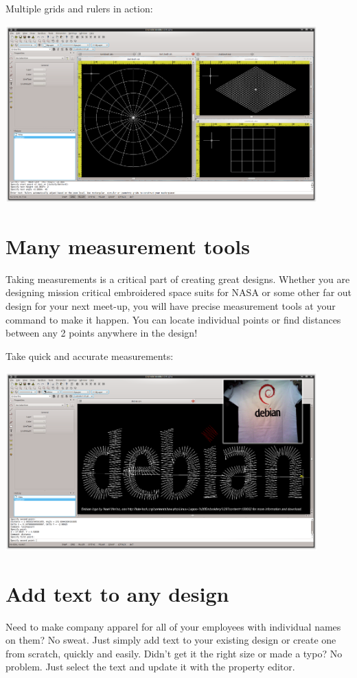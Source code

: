 \documentclass{report}
\begin{document}
Multiple grids and rulers in action:

\includegraphics[width=0.9\textwidth]{images/features-grid-ruler-1.png}

\section{Many measurement tools}

Taking measurements is a critical part of creating great designs. Whether you are designing mission critical embroidered space suits for NASA or some other far out design for your next meet-up, you will have precise measurement tools at your command to make it happen. You can locate individual points or find distances between any 2 points anywhere in the design!

Take quick and accurate measurements:

\includegraphics[width=0.9\textwidth]{images/features-measure-1.png}

\section{Add text to any design}

Need to make company apparel for all of your employees with individual names on them? No sweat. Just simply add text to your existing design or create one from scratch, quickly and easily.
Didn't get it the right size or made a typo? No problem. Just select the text and update it with the property editor.
\end{document}
